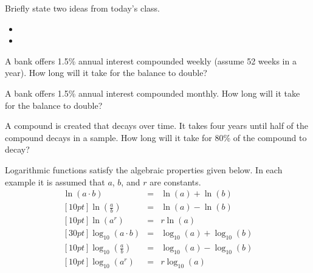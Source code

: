 \begin{problem}
\item Briefly state two ideas from today's class.
  \begin{itemize}
  \item 
  \item 
  \end{itemize}
\item A bank offers 1.5\% annual interest compounded weekly (assume 52
  weeks in a year). How long will it take for the balance to double?
\item A bank offers 1.5\% annual interest compounded monthly. How long
  will it take for the balance to double?
\item A compound is created that decays over time. It takes four years
  until half of the compound decays in a sample. How long will it take
  for 80\% of the compound to decay?
\end{problem}




Logarithmic functions satisfy the algebraic properties given below. In
each example it is assumed that $a$, $b$, and $r$ are constants. 
\begin{eqnarray}
  \ln(a\cdot b) & = & \ln(a) + \ln(b) \\ [10pt]
  \ln\left(\frac{a}{b}\right) & = & \ln(a) - \ln(b) \\  [10pt]
  \ln\left(a^r\right) & = & r \ln(a) \\ [30pt]
  \log_{10}(a\cdot b) & = & \log_{10}(a) + \log_{10}(b) \\ [10pt]
  \log_{10}\left(\frac{a}{b}\right) & = & \log_{10}(a) - \log_{10}(b) \\  [10pt]
  \log_{10}\left(a^r\right) & = & r \log_{10}(a)
\end{eqnarray}



